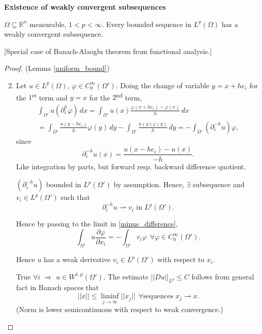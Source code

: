 \documentclass[12pt]{article}
\theoremstyle{definition}
\begin{document}
\textbf{Existence of weakly convergent subsequences}

$\Omega\subseteq\mathbb{R}^n$ measurable, $1<p<\infty$. Every bounded sequence in $L^p(\Omega)$ has a weakly convergent subsequence.

[Special case of Banach-Alaoglu theorem from functional analysis.]

\begin{proof}
(Lemma \ref{uniform_bound})
\begin{enumerate}[label=(\roman*)]
\setcounter{enumi}{1}
\item Let $u\in L^p(\Omega)$, $\varphi\in C_0^{\infty}(\Omega')$. Doing the change of variable $y=x+he_i$ for the $1$\textsuperscript{st} term and $y=x$ for the $2$\textsuperscript{nd} term,
\begin{multline}\tag{$*$}\label{minus_difference}
\int_{\Omega'}u(\partial_i^h\varphi)\,dx=\int_{\Omega'}u(x)\frac{\varphi(x+he_i)-\varphi(x)}{h}\,dx\\
=\int_{\Omega'}\frac{u(y-he_i)}{h}\varphi(y)\,dy-\int_{\Omega'}\frac{u(y)\varphi(y)}{h}\,dy=-\int_{\Omega'}(\partial_i^{-h}u)\varphi,
\end{multline}
since
\[\partial_i^{-h}u(x)=\frac{u(x-he_i)-u(x)}{-h}.\]
Like integration by parts, but forward resp. backward difference quotient.

$(\partial_i^{-h}u)$ bounded in $L^p(\Omega')$ by assumption. Hence, $\exists$ subsequence and $v_i\in L^p(\Omega')$ such that
\[\partial_i^{-h}u\rightharpoonup v_i\text{ in }L^p(\Omega').\]

Hence by passing to the limit in \eqref{minus_difference},
\[\int_{\Omega'}u\frac{\partial\varphi}{\partial x_i}=-\int_{\Omega'}v_i\varphi\ \ \forall\varphi\in C_0^{\infty}(\Omega').\]

Hence $u$ has a weak derivative $v_i\in L^p(\Omega')$ with respect to $x_i$.

True $\forall i$ $\Rightarrow$ $u\in W^{1,p}(\Omega')$. The estimate $||Du||_{L^p}\leq C$ follows from general fact in Banach spaces that
\[||x||\leq\liminf_{j\to\infty}||x_j||\ \ \forall\text{sequences }x_j\rightharpoonup x.\]
(Norm is lower semicontinuous with respect to weak convergence.)
\end{enumerate}
\end{proof}
\end{document}
